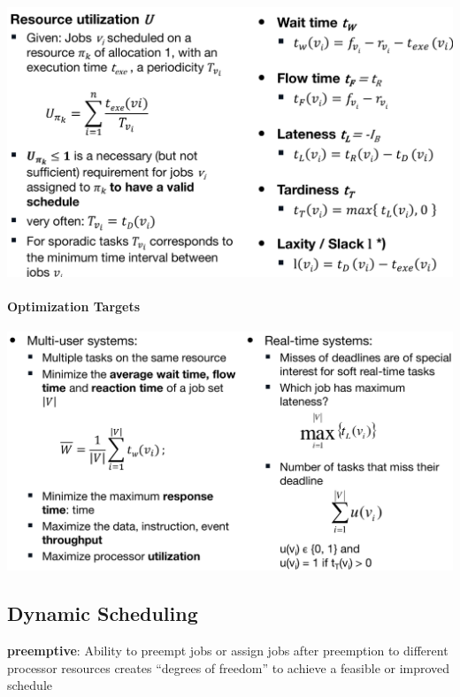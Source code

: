 \documentclass[english]{latex4ei/latex4ei_sheet}
\begin{document}
\begin{center}
  \centering
  \includegraphics[width=\linewidth]{assets/SchedulingTimingMetrics.png}
  \label{fig:schedulingtimingmetrics}
\end{center}

\paragraph{Optimization Targets}

\begin{center}
  \centering
  \includegraphics[width=\linewidth]{assets/OptimizationTargets.png}
  \label{fig:optimizationtargets}
\end{center}


\subsection{Dynamic Scheduling}

\textbf{preemptive}: Ability to preempt jobs or assign jobs after preemption to different processor resources creates “degrees of freedom” to achieve a feasible or improved schedule
\end{document}
